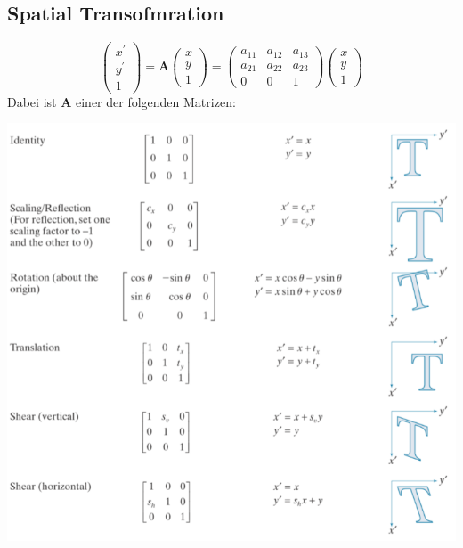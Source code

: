 \subsection{Spatial Transofmration}
\[
\begin{pmatrix}
	x^\prime \\ y^\prime \\ 1
\end{pmatrix} = \mathbf{A} \begin{pmatrix}
x \\ y \\ 1
\end{pmatrix} = \begin{pmatrix}
a_{11}  & a_{12} & a_{13}\\ a_{21}  & a_{22} & a_{23} \\ 0 & 0 & 1
\end{pmatrix} \begin{pmatrix}
x \\ y \\ 1
\end{pmatrix}
\]
Dabei ist $\mathbf{A}$ einer der folgenden Matrizen:
\begin{center}
	\includegraphics[width=\columnwidth]{Images/affine}
\end{center}
